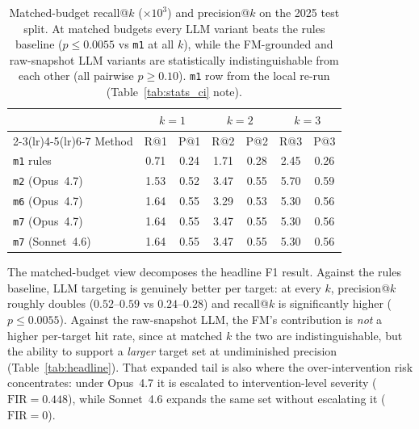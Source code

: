 \begin{table}[!htbp]
\centering
\footnotesize
\setlength{\tabcolsep}{4pt}
\caption{Matched-budget recall@$k$ ($\times 10^{3}$) and
precision@$k$ on the 2025 test split. At matched budgets every LLM
variant beats the rules baseline ($p\!\leq\!0.0055$ vs \texttt{m1}
at all $k$), while the FM-grounded and raw-snapshot LLM variants
are statistically indistinguishable from each other (all pairwise
$p\!\geq\!0.10$). \texttt{m1} row from the local re-run
(Table~\ref{tab:stats_ci} note).}
\label{tab:matched_budget}
\begin{tabular}{@{}lcccccc@{}}
\toprule
& \multicolumn{2}{c}{$k\!=\!1$} & \multicolumn{2}{c}{$k\!=\!2$} & \multicolumn{2}{c}{$k\!=\!3$} \\
\cmidrule(lr){2-3}\cmidrule(lr){4-5}\cmidrule(lr){6-7}
Method & R@1 & P@1 & R@2 & P@2 & R@3 & P@3 \\
\midrule
\texttt{m1} rules            & 0.71 & 0.24 & 1.71 & 0.28 & 2.45 & 0.26 \\
\texttt{m2} (Opus~4.7)       & 1.53 & 0.52 & 3.47 & 0.55 & 5.70 & 0.59 \\
\texttt{m6} (Opus~4.7)       & 1.64 & 0.55 & 3.29 & 0.53 & 5.30 & 0.56 \\
\texttt{m7} (Opus~4.7)       & 1.64 & 0.55 & 3.47 & 0.55 & 5.30 & 0.56 \\
\texttt{m7} (Sonnet~4.6)     & 1.64 & 0.55 & 3.47 & 0.55 & 5.30 & 0.56 \\
\bottomrule
\end{tabular}
\end{table}

The matched-budget view decomposes the headline F1 result. Against the
rules baseline, LLM targeting is genuinely better per target: at every $k$,
precision@$k$ roughly doubles ($0.52$--$0.59$ vs $0.24$--$0.28$) and
recall@$k$ is significantly higher ($p\!\leq\!0.0055$). Against the
raw-snapshot LLM, the FM's contribution is \emph{not} a higher per-target
hit rate, since at matched $k$ the two are indistinguishable, but the ability
to support a \emph{larger} target set at undiminished precision
(Table~\ref{tab:headline}). That expanded tail is also where the
over-intervention risk concentrates: under Opus~4.7 it is escalated to
intervention-level severity ($\mathrm{FIR}\!=\!0.448$), while Sonnet~4.6
expands the same set without escalating it ($\mathrm{FIR}\!=\!0$).
